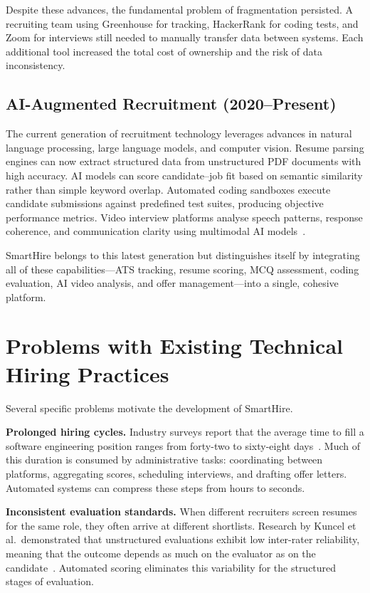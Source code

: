Despite these advances, the fundamental problem of fragmentation persisted. A recruiting team using Greenhouse for tracking, HackerRank for coding tests, and Zoom for interviews still needed to manually transfer data between systems. Each additional tool increased the total cost of ownership and the risk of data inconsistency.

\subsection{AI-Augmented Recruitment (2020--Present)}

The current generation of recruitment technology leverages advances in natural language processing, large language models, and computer vision. Resume parsing engines can now extract structured data from unstructured PDF documents with high accuracy. AI models can score candidate--job fit based on semantic similarity rather than simple keyword overlap. Automated coding sandboxes execute candidate submissions against predefined test suites, producing objective performance metrics. Video interview platforms analyse speech patterns, response coherence, and communication clarity using multimodal AI models~\cite{black2020}.

SmartHire belongs to this latest generation but distinguishes itself by integrating all of these capabilities---ATS tracking, resume scoring, MCQ assessment, coding evaluation, AI video analysis, and offer management---into a single, cohesive platform.

\section{Problems with Existing Technical Hiring Practices}
\label{sec:problems}

Several specific problems motivate the development of SmartHire.

\textbf{Prolonged hiring cycles.} Industry surveys report that the average time to fill a software engineering position ranges from forty-two to sixty-eight days~\cite{shrm2022}. Much of this duration is consumed by administrative tasks: coordinating between platforms, aggregating scores, scheduling interviews, and drafting offer letters. Automated systems can compress these steps from hours to seconds.

\textbf{Inconsistent evaluation standards.} When different recruiters screen resumes for the same role, they often arrive at different shortlists. Research by Kuncel et al.\ demonstrated that unstructured evaluations exhibit low inter-rater reliability, meaning that the outcome depends as much on the evaluator as on the candidate~\cite{kuncel2013}. Automated scoring eliminates this variability for the structured stages of evaluation.

